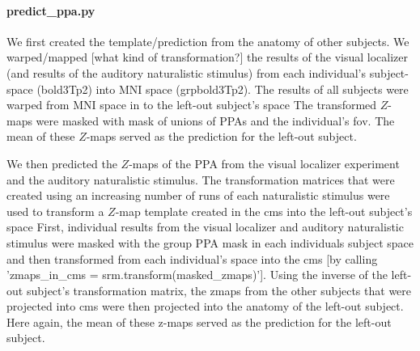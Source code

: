 \paragraph{predict\_ppa.py}

We first created the template/prediction from the anatomy of other subjects.
%
We warped/mapped [what kind of transformation?] the results of the visual
localizer (and results of the auditory naturalistic stimulus) from each
individual's subject-space (bold3Tp2) into MNI space (grpbold3Tp2).
The results of all subjects were warped from MNI space in to the left-out
subject's space
The transformed $Z$-maps were masked with mask of unions of PPAs and the
individual's \ac{fov}.
%
The mean of these $Z$-maps served as the prediction for the left-out subject.

We then predicted the $Z$-maps of the PPA from the visual localizer experiment
and the auditory naturalistic stimulus.
%
The transformation matrices that were created using an increasing number of runs
of each naturalistic stimulus were used to transform a $Z$-map template created
in the \ac{cms} into the left-out subject's space
%
First, individual results from the visual localizer and auditory naturalistic
stimulus were masked with the group PPA mask in each individuals subject space
and then transformed from each individual's space into the \ac{cms} [by calling
'zmaps\_in\_cms = srm.transform(masked\_zmaps)'].
Using the inverse of the left-out subject's transformation matrix, the zmaps
from the other subjects that were projected into \ac{cms} were then projected
into the anatomy of the left-out subject.
%
Here again, the mean of these z-maps served as the prediction for the left-out
subject.



